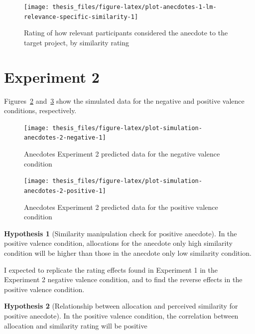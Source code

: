 \documentclass[a4paper, nobind, dvipsnames]{templates/ociamthesis}
\theoremstyle{definition}
\theoremstyle{definition}
\theoremstyle{definition}
\theoremstyle{definition}
\newtheorem{hypothesis}{Hypothesis}[chapter]
\theoremstyle{remark}
\begin{document}
\begin{figure}
\texttt{[image: thesis\_files/figure-latex/plot-anecdotes-1-lm-relevance-specific-similarity-1]} \caption{Rating of how relevant participants considered the anecdote to the target project, by similarity rating}\label{fig:plot-anecdotes-1-lm-relevance-specific-similarity}
\end{figure}

\hypertarget{anecdotes-2-appendix}{%
\section{Experiment 2}\label{anecdotes-2-appendix}}

Figures~\ref{fig:plot-simulation-anecdotes-2-negative}
and~\ref{fig:plot-simulation-anecdotes-2-positive} show the simulated data for
the negative and positive valence conditions, respectively.



\begin{figure}
\texttt{[image: thesis\_files/figure-latex/plot-simulation-anecdotes-2-negative-1]} \caption{Anecdotes Experiment 2 predicted data for the negative valence condition}\label{fig:plot-simulation-anecdotes-2-negative}
\end{figure}



\begin{figure}
\texttt{[image: thesis\_files/figure-latex/plot-simulation-anecdotes-2-positive-1]} \caption{Anecdotes Experiment 2 predicted data for the positive valence condition}\label{fig:plot-simulation-anecdotes-2-positive}
\end{figure}

\begin{hypothesis}[Similarity manipulation check for positive anecdote]
\protect\hypertarget{hyp:similarity-check-anecdotes-2}{}{\label{hyp:similarity-check-anecdotes-2} {} }In the positive valence condition, allocations for the anecdote only high
similarity condition will be higher than those in the anecdote only low
similarity condition.
\end{hypothesis}

I expected to replicate the rating effects found in Experiment 1 in the
Experiment 2 negative valence condition, and to find the reverse effects in the
positive valence condition.

\begin{hypothesis}[Relationship between allocation and perceived similarity for positive anecdote]
\protect\hypertarget{hyp:allocation-similarity-anecdotes-2}{}{\label{hyp:allocation-similarity-anecdotes-2} {} }In the positive valence condition, the correlation between allocation and
similarity rating will be positive
\end{hypothesis}
\end{document}
